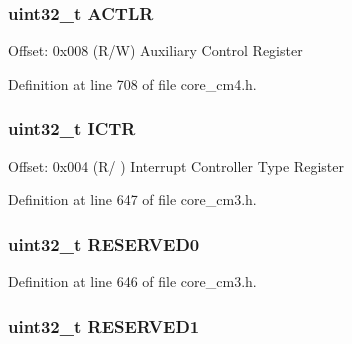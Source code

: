 \subsubsection[{\texorpdfstring{A\+C\+T\+LR}{ACTLR}}]{ uint32\+\_\+t A\+C\+T\+LR}\hypertarget{struct_s_cn_s_c_b___type_afabed911b9f91f9df848999e1b5d6504}{}\label{struct_s_cn_s_c_b___type_afabed911b9f91f9df848999e1b5d6504}
Offset\+: 0x008 (R/W) Auxiliary Control Register 

Definition at line 708 of file core\+\_\+cm4.\+h.

\subsubsection[{\texorpdfstring{I\+C\+TR}{ICTR}}]{ uint32\+\_\+t I\+C\+TR}\hypertarget{struct_s_cn_s_c_b___type_acf9b76331abd768af25a10b3625da4b4}{}\label{struct_s_cn_s_c_b___type_acf9b76331abd768af25a10b3625da4b4}
Offset\+: 0x004 (R/ ) Interrupt Controller Type Register 

Definition at line 647 of file core\+\_\+cm3.\+h.

\subsubsection[{\texorpdfstring{R\+E\+S\+E\+R\+V\+E\+D0}{RESERVED0}}]{\setlength{\rightskip}{0pt plus 5cm}uint32\+\_\+t R\+E\+S\+E\+R\+V\+E\+D0}\hypertarget{struct_s_cn_s_c_b___type_affae06cd6df5e9fe9a92994052fd3bec}{}\label{struct_s_cn_s_c_b___type_affae06cd6df5e9fe9a92994052fd3bec}


Definition at line 646 of file core\+\_\+cm3.\+h.

\subsubsection[{\texorpdfstring{R\+E\+S\+E\+R\+V\+E\+D1}{RESERVED1}}]{\setlength{\rightskip}{0pt plus 5cm}uint32\+\_\+t R\+E\+S\+E\+R\+V\+E\+D1}\hypertarget{struct_s_cn_s_c_b___type_aaa45b15c650670f4f84000a1f419ca00}{}\label{struct_s_cn_s_c_b___type_aaa45b15c650670f4f84000a1f419ca00}


